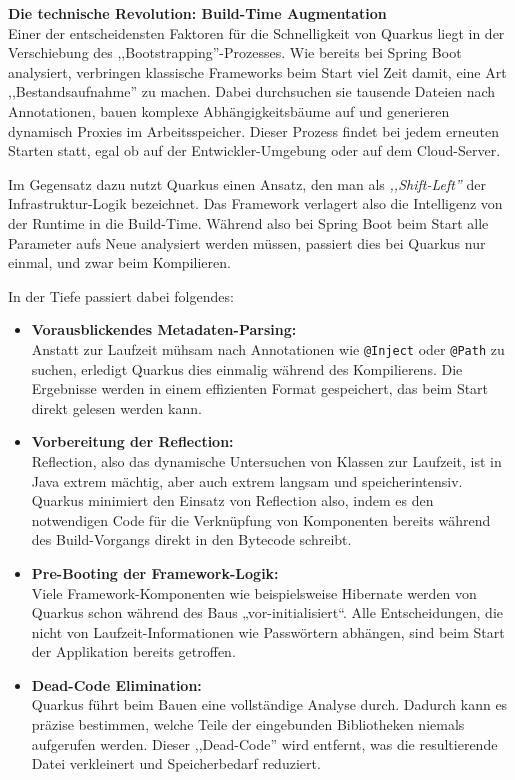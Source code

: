 \vspace{0.7cm}
\textbf{Die technische Revolution: Build-Time Augmentation} \\
Einer der entscheidensten Faktoren für die Schnelligkeit von Quarkus liegt in der Verschiebung des ,,Bootstrapping''-Prozesses. Wie bereits bei Spring Boot analysiert, verbringen klassische Frameworks beim Start viel Zeit damit, eine Art ,,Bestandsaufnahme'' zu machen. Dabei durchsuchen sie tausende Dateien nach Annotationen, bauen komplexe Abhängigkeitsbäume auf und generieren dynamisch Proxies im Arbeitsspeicher. Dieser Prozess findet bei jedem erneuten Starten statt, egal ob auf der Entwickler-Umgebung oder auf dem Cloud-Server.

Im Gegensatz dazu nutzt Quarkus einen Ansatz, den man als \textit{,,Shift-Left''} der Infrastruktur-Logik bezeichnet. Das Framework verlagert also die Intelligenz von der Runtime in die Build-Time. Während also bei Spring Boot beim Start alle Parameter aufs Neue analysiert werden müssen, passiert dies bei Quarkus nur einmal, und zwar beim Kompilieren.\cite{ProsAndConsSpringVsQuarkus}

In der Tiefe passiert dabei folgendes:
\begin{itemize}
	\item \textbf{Vorausblickendes Metadaten-Parsing:} \\ 
	Anstatt zur Laufzeit mühsam nach Annotationen wie \texttt{@Inject} oder \texttt{@Path} zu suchen, erledigt Quarkus dies einmalig während des Kompilierens. Die Ergebnisse werden in einem effizienten Format gespeichert, das beim Start direkt gelesen werden kann.
	\item \textbf{Vorbereitung der Reflection:} \\ 
	Reflection, also das dynamische Untersuchen von Klassen zur Laufzeit, ist in Java extrem mächtig, aber auch extrem langsam und speicherintensiv. Quarkus minimiert den Einsatz von Reflection also, indem es den notwendigen Code für die Verknüpfung von Komponenten bereits während des Build-Vorgangs direkt in den Bytecode schreibt.
	\item \textbf{Pre-Booting der Framework-Logik:} \\ 
	Viele Framework-Komponenten wie beispielsweise Hibernate werden von Quarkus schon während des Baus „vor-initialisiert“. Alle Entscheidungen, die nicht von Laufzeit-Informationen wie Passwörtern abhängen, sind beim Start der Applikation bereits getroffen.
	\item \textbf{Dead-Code Elimination:} \\ 
	Quarkus führt beim Bauen eine vollständige Analyse durch. Dadurch kann es präzise bestimmen, welche Teile der eingebunden Bibliotheken niemals aufgerufen werden. Dieser ,,Dead-Code'' wird entfernt, was  die resultierende Datei verkleinert und Speicherbedarf reduziert.
\end{itemize}

